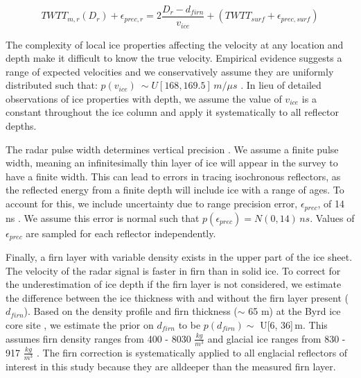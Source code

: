 \begin{equation}\label{deptheqn}
TWTT_{m,r}(D_r) + \epsilon_{prec,r} = 2 \frac{D_r - d_{firn}}{v_{ice}} + (TWTT_{surf} + \epsilon_{prec,surf})
\end{equation}

The complexity of local ice properties affecting the velocity at any location and depth make it difficult to know the true velocity. Empirical evidence suggests a range of expected velocities and we conservatively assume they are uniformly distributed such that: $p(v_{ice}) ~\sim U[168,169.5]\,m/{\mu}s$ \citep{fujita2000}. In lieu of detailed observations of ice properties with depth, we assume the value of $v_{ice}$ is a constant throughout the ice column and apply it systematically to all reflector depths.

The radar pulse width determines vertical precision \citep{millar1982}. We assume a finite pulse width, meaning an infinitesimally thin layer of ice will appear in the survey to have a finite width. This can lead to errors in tracing isochronous reflectors, as the reflected energy from a finite depth will include ice with a range of ages. To account for this, we include uncertainty due to range precision error, $\epsilon_{prec}$, of 14 ns \citep{cavitte2016}. We assume this error is normal such that $p(\epsilon_{prec}) = N(0,14)\,ns$. Values of $\epsilon_{prec}$ are sampled for each reflector independently.

Finally, a firn layer with variable density exists in the upper part of the ice sheet. The velocity of the radar signal is faster in firn than in solid ice. To correct for the underestimation of ice depth if the firn layer is not considered, we estimate the difference between the ice thickness with and without the firn layer present ($d_{firn}$). Based on the density profile and firn thickness ($\sim$ 65 m) at the Byrd ice core site \citep{gow1970}, we estimate the prior on $d_{firn}$ to be $p(d_{firn})\sim$ U[6, 36]\,m. This assumes firn density ranges from 400 - 8030 $\frac{kg}{m^3}$ and glacial ice ranges from 830 - 917 $\frac{kg}{m^3}$ \citep{paterson1994}. The firn correction is systematically applied to all englacial reflectors of interest in this study because they are alldeeper than the measured firn layer.%

